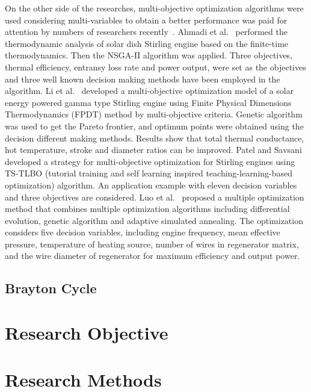 On the other side of the researches, multi-objective optimization algorithms were used considering multi-variables to obtain a better performance was paid for attention by numbers of researchers recently~\cite{Ahmadi2016,Li2016b,Patel2016,Luo2016}.
Ahmadi et al.~\cite{Ahmadi2016} performed the thermodynamic analysis of solar dish Stirling engine based on the finite-time thermodynamics. Then the NSGA-II algorithm was applied. Three objectives, thermal efficiency, entransy loss rate and power output, were set as the objectives and three well known decision making methods have been employed in the algorithm.
Li et al.~\cite{Li2016b} developed a multi-objective optimization model of a solar energy powered gamma type Stirling engine using Finite Physical Dimensions Thermodynamics (FPDT) method by multi-objective criteria. Genetic algorithm was used to get the Pareto frontier, and optimum points were obtained using the decision different making methods. Results show that total thermal conductance, hot temperature, stroke and diameter ratios can be improved.
Patel and Savsani~\cite{Patel2016} developed a strategy for multi-objective optimization for Stirling engines using TS-TLBO (tutorial training and self learning inspired teaching-learning-based optimization) algorithm. An application example with eleven decision variables and three objectives are considered.
Luo et al.~\cite{Luo2016} proposed a multiple optimization method that combines multiple optimization algorithms including differential evolution, genetic algorithm and adaptive simulated annealing. The optimization considers five decision variables, including engine frequency, mean effective pressure, temperature of heating source, number of wires in regenerator matrix, and the wire diameter of regenerator for maximum efficiency and output power.
\subsection{Brayton Cycle}\label{bc}
\section{Research Objective}\label{sec:3}
\section{Research Methods}

